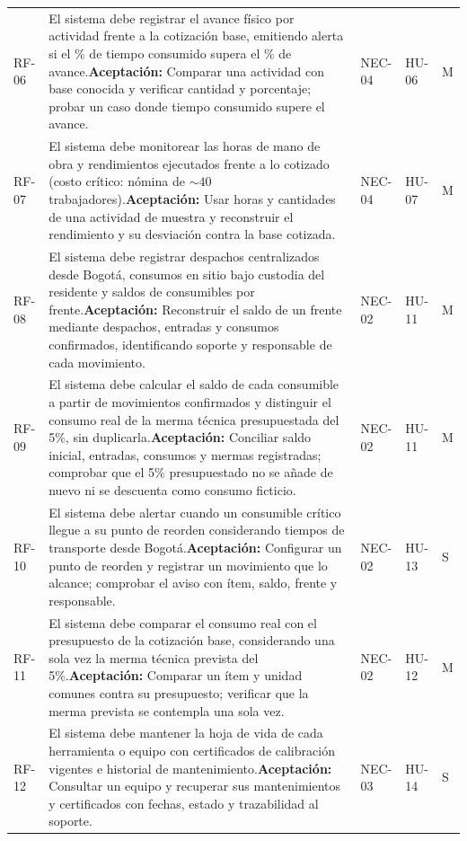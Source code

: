 \documentclass[12pt,letterpaper]{article}
\begin{document}
{\begin{longtable}{@{}L{1.6cm}L{8.05cm}L{2.0cm}L{1.5cm}L{1.2cm}@{}}
RF-06 & El sistema debe registrar el avance físico por actividad frente a la cotización base, emitiendo alerta si el \% de tiempo consumido supera el \% de avance.\newline \textbf{Aceptación:} Comparar una actividad con base conocida y verificar cantidad y porcentaje; probar un caso donde tiempo consumido supere el avance. & NEC-04 & HU-06 & M\\
RF-07 & El sistema debe monitorear las horas de mano de obra y rendimientos ejecutados frente a lo cotizado (costo crítico: nómina de $\sim 40$ trabajadores).\newline \textbf{Aceptación:} Usar horas y cantidades de una actividad de muestra y reconstruir el rendimiento y su desviación contra la base cotizada. & NEC-04 & HU-07 & M\\
RF-08 & El sistema debe registrar despachos centralizados desde Bogotá, consumos en sitio bajo custodia del residente y saldos de consumibles por frente.\newline \textbf{Aceptación:} Reconstruir el saldo de un frente mediante despachos, entradas y consumos confirmados, identificando soporte y responsable de cada movimiento. & NEC-02 & HU-11 & M\\
RF-09 & El sistema debe calcular el saldo de cada consumible a partir de movimientos confirmados y distinguir el consumo real de la merma técnica presupuestada del 5\%, sin duplicarla.\newline \textbf{Aceptación:} Conciliar saldo inicial, entradas, consumos y mermas registradas; comprobar que el 5\% presupuestado no se añade de nuevo ni se descuenta como consumo ficticio. & NEC-02 & HU-11 & M\\
RF-10 & El sistema debe alertar cuando un consumible crítico llegue a su punto de reorden considerando tiempos de transporte desde Bogotá.\newline \textbf{Aceptación:} Configurar un punto de reorden y registrar un movimiento que lo alcance; comprobar el aviso con ítem, saldo, frente y responsable. & NEC-02 & HU-13 & S\\
RF-11 & El sistema debe comparar el consumo real con el presupuesto de la cotización base, considerando una sola vez la merma técnica prevista del 5\%.\newline \textbf{Aceptación:} Comparar un ítem y unidad comunes contra su presupuesto; verificar que la merma prevista se contempla una sola vez. & NEC-02 & HU-12 & M\\
RF-12 & El sistema debe mantener la hoja de vida de cada herramienta o equipo con certificados de calibración vigentes e historial de mantenimiento.\newline \textbf{Aceptación:} Consultar un equipo y recuperar sus mantenimientos y certificados con fechas, estado y trazabilidad al soporte. & NEC-03 & HU-14 & S\\

\end{longtable}}
\end{document}
